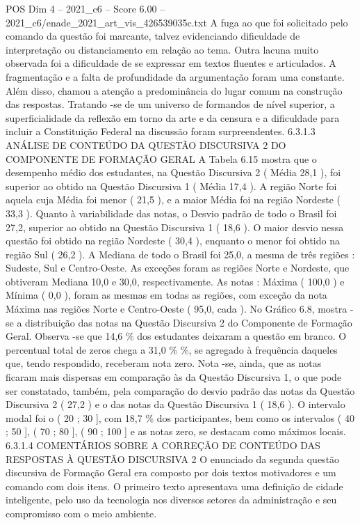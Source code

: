 \begin{textsample}{POS Dim 4 – 2021\_c6 – Score 6.00 – 2021\_c6/enade\_2021\_art\_vis\_426539035c.txt}
A fuga ao que foi solicitado pelo comando da questão foi marcante, talvez evidenciando dificuldade de interpretação ou distanciamento em relação ao tema.
Outra lacuna muito observada foi a dificuldade de se expressar em textos fluentes e articulados.
A fragmentação e a falta de profundidade da argumentação foram uma constante.
Além disso, chamou a atenção a predominância do lugar comum na construção das respostas.
Tratando -se de um universo de formandos de nível superior, a superficialidade da reflexão em torno da arte e da censura e a dificuldade para incluir a Constituição Federal na discussão foram surpreendentes. 6.3.1.3 ANÁLISE DE CONTEÚDO DA QUESTÃO DISCURSIVA 2 DO COMPONENTE DE FORMAÇÃO GERAL A Tabela 6.15 mostra que o desempenho médio dos estudantes, na Questão Discursiva 2 ( Média 28,1 ), foi superior ao obtido na Questão Discursiva 1 ( Média 17,4 ).
A região Norte foi aquela cuja Média foi menor ( 21,5 ), e a maior Média foi na região Nordeste ( 33,3 ).
Quanto à variabilidade das notas, o Desvio padrão de todo o Brasil foi 27,2, superior ao obtido na Questão Discursiva 1 ( 18,6 ).
O maior desvio nessa questão foi obtido na região Nordeste ( 30,4 ), enquanto o menor foi obtido na região Sul ( 26,2 ).
A Mediana de todo o Brasil foi 25,0, a mesma de três regiões : Sudeste, Sul e Centro-Oeste.
As exceções foram as regiões Norte e Nordeste, que obtiveram Mediana 10,0 e 30,0, respectivamente.
As notas : Máxima ( 100,0 ) e Mínima ( 0,0 ), foram as mesmas em todas as regiões, com exceção da nota Máxima nas regiões Norte e Centro-Oeste ( 95,0, cada ).
No Gráfico 6.8, mostra -se a distribuição das notas na Questão Discursiva 2 do Componente de Formação Geral.
Observa -se que 14,6 \% dos estudantes deixaram a questão em branco.
O percentual total de zeros chega a 31,0 \% \%, se agregado à frequência daqueles que, tendo respondido, receberam nota zero.
Nota -se, ainda, que as notas ficaram mais dispersas em comparação às da Questão Discursiva 1, o que pode ser constatado, também, pela comparação do desvio padrão das notas da Questão Discursiva 2 ( 27,2 ) e o das notas da Questão Discursiva 1 ( 18,6 ).
O intervalo modal foi o ( 20 ; 30 ], com 18,7 \% dos participantes, bem como os intervalos ( 40 ; 50 ], ( 70 ; 80 ], ( 90 ; 100 ] e as notas zero, se destacam como máximos locais. 6.3.1.4 COMENTÁRIOS SOBRE A CORREÇÃO DE CONTEÚDO DAS RESPOSTAS À QUESTÃO DISCURSIVA 2 O enunciado da segunda questão discursiva de Formação Geral era composto por dois textos motivadores e um comando com dois itens.
O primeiro texto apresentava uma definição de cidade inteligente, pelo uso da tecnologia nos diversos setores da administração e seu compromisso com o meio ambiente.

\end{textsample}
